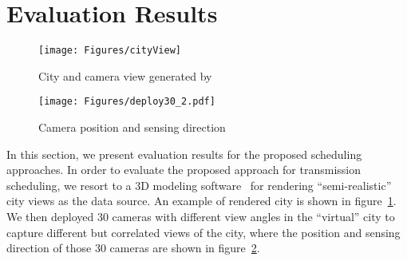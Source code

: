 \section{Evaluation Results}
\label{sec::evaluation}
%
\begin{figure}
\begin{center}
\texttt{[image: Figures/cityView]}
\caption{\label{fig::cityView}City and camera view generated by~\cite{Suicidator,Blender}}
\end{center}
\end{figure}
%
\begin{figure}
\begin{center}
\texttt{[image: Figures/deploy30\_2.pdf]}
\caption{\label{fig::deploy30}Camera position and sensing direction}
\end{center}
\end{figure}
%
In this section, we present evaluation results for the proposed scheduling approaches.
In order to evaluate the proposed approach for transmission scheduling, we resort to a 3D modeling software~\cite{Suicidator,Blender} for rendering ``semi-realistic'' city views as the data source.
An example of rendered city is shown in figure~\ref{fig::cityView}.
We then deployed 30 cameras with different view angles in the ``virtual'' city to capture different but correlated views of the city, where the position and sensing direction of those 30 cameras are shown in figure~\ref{fig::deploy30}.

